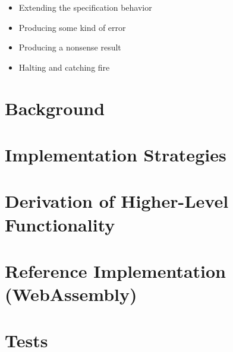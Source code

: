\documentclass[twocolumn]{report}
\begin{document}
\begin{itemize}
\item Extending the specification behavior
\item Producing some kind of error
\item Producing a nonsense result
\item Halting and catching fire
\end{itemize}



\appendix

\chapter{Background}
\label{appendix:background}

\chapter{Implementation Strategies}
\label{appendix:implementation_strategies}

\chapter{Derivation of Higher-Level Functionality}
\label{appendix:higher_level_derivation}

\chapter{Reference Implementation (WebAssembly)}
\label{appendix:reference_implementation_wasm}

\chapter{Tests}
\label{appendix:tests}
\end{document}
